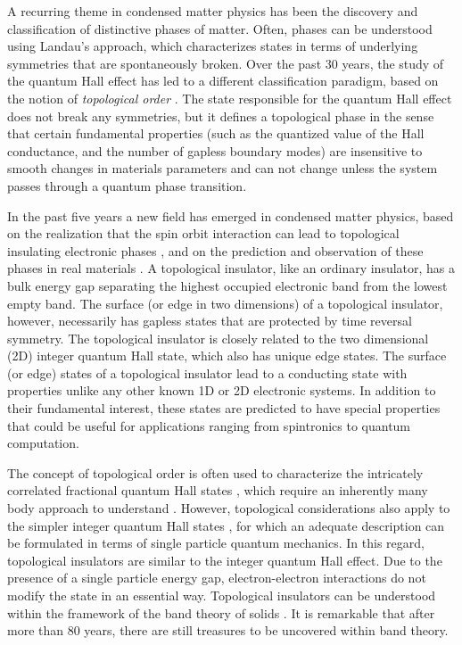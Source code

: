 \documentclass[twocolumn,floatfix,showpacs,rmp,aps]{revtex4}
\begin{document}
A recurring theme in condensed matter physics
has been the discovery and classification of distinctive phases of matter.
Often, phases can be understood using Landau's approach, which characterizes
states in terms of underlying symmetries that are spontaneously
broken.   Over the past 30 years, the study
of the quantum Hall effect has led to a different classification paradigm, based
on the notion of {\it topological order} \cite{thouless82,wen95}.  The
state responsible for the quantum Hall effect does not
break any symmetries, but it defines a topological phase in the
sense that certain fundamental properties (such as the quantized value of the
Hall conductance, and the number of gapless boundary modes)
are insensitive to smooth changes in materials
parameters and can not change unless the system passes
through a quantum phase transition.

In the past five years a new field has emerged in condensed matter
physics, based on the realization that the spin orbit interaction can
lead to topological insulating electronic phases
\cite{kanemele05a,kanemele05b,moorebalents07,fukanemele07,roy09b}, and on the prediction
and observation of these phases in real materials
\cite{bernevighugheszhang06,fukane07,konig07,hsieh08,xia09a,zhangh09}.  A
topological insulator, like an ordinary insulator, has a bulk energy
gap separating the highest occupied electronic band from the lowest
empty band. The surface (or edge in two dimensions) of a topological
insulator, however, necessarily has gapless states that are
protected by time reversal symmetry.  The
topological insulator is closely related to the two dimensional (2D)
integer quantum Hall state, which also has unique
edge states.   The surface (or edge) states of a topological insulator lead
to a conducting state with properties unlike any other known
1D or 2D electronic systems.  In addition to their
fundamental interest, these states are predicted to have special
properties that could be useful for applications ranging from
spintronics to quantum computation.

The concept of topological order \cite{wen95} is often used to characterize the
intricately correlated fractional quantum Hall states \cite{tsui82}, which require an
inherently many body approach to understand \cite{laughlin83}.  However,
topological considerations also apply to the simpler
integer quantum Hall states \cite{thouless82}, for
which an adequate description can be formulated in terms of single
particle quantum mechanics.  In this regard, topological insulators
are similar to the integer quantum Hall effect.  Due to the presence of a
single particle energy gap, electron-electron
interactions do not modify the state in an essential way.
Topological insulators can be understood within the framework of the band
theory of solids \cite{bloch29}.  It is remarkable that after more than 80 years,
there are still treasures to be uncovered within band theory.
\end{document}
